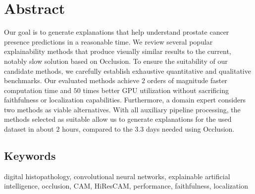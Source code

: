\chapter*{Abstract}

Our goal is to generate explanations that help understand prostate cancer presence predictions in a reasonable time.
We review several popular explainability methods that produce visually similar results to the current, notably slow solution based on Occlusion.
To ensure the suitability of our candidate methods, we carefully establish exhaustive quantitative and qualitative benchmarks.
Our evaluated methods achieve $2$ orders of magnitude faster computation time and $50$ times better GPU utilization without sacrificing faithfulness or localization capabilities.
Furthermore, a domain expert considers two methods as viable alternatives.
With all auxiliary pipeline processing, the methods selected as suitable allow us to generate explanations for the used dataset in about $2$ hours, compared to the $3.3$ days needed using Occlusion.

\section*{Keywords}
digital histopathology, convolutional neural networks, explainable artificial intelligence, occlusion, CAM, HiResCAM, performance, faithfulness, localization

